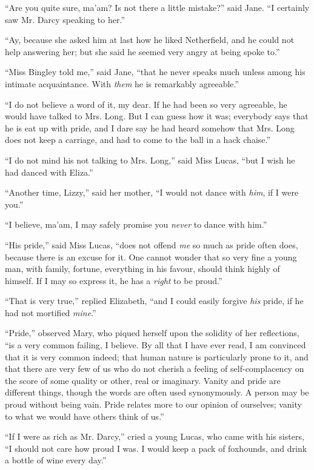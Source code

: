 ``Are you quite sure, ma'am? Is not there a little mistake?'' said Jane. ``I certainly saw Mr. Darcy speaking to her.''

``Ay, because she asked him at last how he liked Netherfield, and he could not help answering her; but she said he seemed very angry at being spoke to.''

``Miss Bingley told me,'' said Jane, ``that he never speaks much unless among his intimate acquaintance. With \textit{them} he is remarkably agreeable.''

``I do not believe a word of it, my dear. If he had been so very agreeable, he would have talked to Mrs. Long. But I can guess how it was; everybody says that he is eat up with pride, and I dare say he had heard somehow that Mrs. Long does not keep a carriage, and had to come to the ball in a hack chaise.''

``I do not mind his not talking to Mrs. Long,'' said Miss Lucas, ``but I wish he had danced with Eliza.''

``Another time, Lizzy,'' said her mother, ``I would not dance with \textit{him}, if I were you.''

``I believe, ma'am, I may safely promise you \textit{never} to dance with him.''

``His pride,'' said Miss Lucas, ``does not offend \textit{me} so much as pride often does, because there is an excuse for it. One cannot wonder that so very fine a young man, with family, fortune, everything in his favour, should think highly of himself. If I may so express it, he has a \textit{right} to be proud.''

``That is very true,'' replied Elizabeth, ``and I could easily forgive \textit{his} pride, if he had not mortified \textit{mine}.''

``Pride,'' observed Mary, who piqued herself upon the solidity of her reflections, ``is a very common failing, I believe. By all that I have ever read, I am convinced that it is very common indeed; that human nature is particularly prone to it, and that there are very few of us who do not cherish a feeling of self-complacency on the score of some quality or other, real or imaginary. Vanity and pride are different things, though the words are often used synonymously. A person may be proud without being vain. Pride relates more to our opinion of ourselves; vanity to what we would have others think of us.''

``If I were as rich as Mr. Darcy,'' cried a young Lucas, who came with his sisters, ``I should not care how proud I was. I would keep a pack of foxhounds, and drink a bottle of wine every day.''

